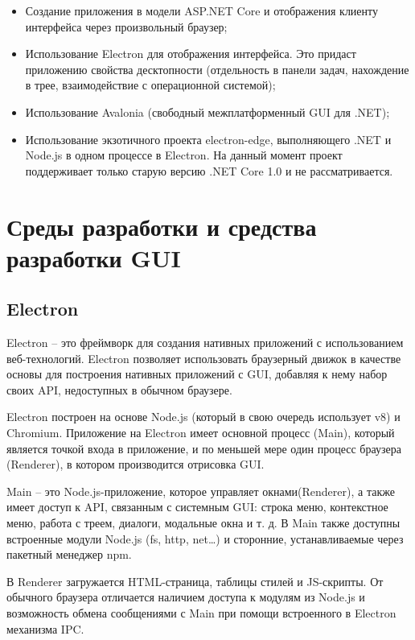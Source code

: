 \documentclass[10pt, a5paper]{article}
\begin{document}
\begin{itemize}
  \item Создание приложения в модели ASP.NET Core и отображения клиенту интерфейса через произвольный браузер;
  \item Использование Electron для отображения интерфейса. Это придаст приложению свойства десктопности (отдельность в панели задач, нахождение в трее, взаимодействие с операционной системой);
  \item Использование Avalonia (свободный межплатформенный GUI для .NET);
  \item Использование экзотичного проекта electron-edge, выполняющего .NET и Node.js в одном процессе в Electron. На данный момент проект поддерживает только старую версию .NET Core 1.0 и не рассматривается.
\end{itemize}

\section*{Среды разработки и средства разработки GUI}

\subsection*{Electron}

Electron – это фреймворк для создания нативных приложений с использованием веб-технологий. Electron позволяет использовать браузерный движок в качестве основы для построения нативных приложений с GUI, добавляя к нему набор своих API, недоступных в обычном браузере.

Electron построен на основе Node.js (который в свою очередь использует v8) и Chromium. Приложение на Electron имеет основной процесс (Main), который является точкой входа в приложение, и по меньшей мере один процесс браузера (Renderer), в котором производится отрисовка GUI.

Main – это Node.js-приложение, которое управляет окнами\linebreak (Renderer), а также имеет доступ к API, связанным с системным GUI: строка меню, контекстное меню, работа с треем, диалоги, модальные окна и т. д. В Main также доступны встроенные модули Node.js (fs, http, net\ldots{}) и сторонние, устанавливаемые через пакетный менеджер npm.

В Renderer загружается HTML-страница, таблицы стилей и JS-скрипты. От обычного браузера отличается наличием доступа к модулям из Node.js и возможность обмена сообщениями с Main при помощи встроенного в Electron механизма IPC.
\end{document}
